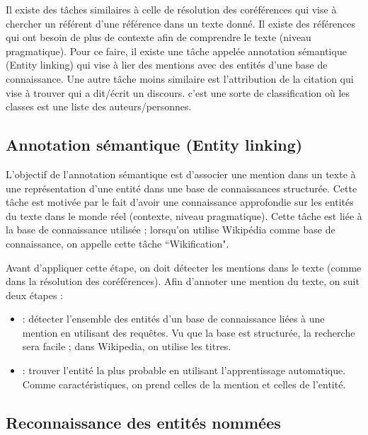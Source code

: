 \documentclass{KodeBook}
\begin{document}
Il existe des tâches similaires à celle de résolution des coréférences qui vise à chercher un référent d'une référence dans un texte donné. 
Il existe des références qui ont besoin de plus de contexte afin de comprendre le texte (niveau pragmatique). 
Pour ce faire, il existe une tâche appelée annotation sémantique (Entity linking) qui vise à lier des mentions avec des entités d'une base de connaissance. 
Une autre tâche moins similaire est l'attribution de la citation qui vise à trouver qui a dit/écrit un discours. 
c'est une sorte de classification où les classes est une liste des auteurs/personnes.


\subsection{Annotation sémantique (Entity linking)}

L'objectif de l'annotation sémantique est d'associer une mention dans un texte à une représentation d'une entité dans une base de connaissances structurée. 
Cette tâche est motivée par le fait d'avoir une connaissance approfondie sur les entités du texte dans le monde réel (contexte, niveau pragmatique).
Cette tâche est liée à la base de connaissance utilisée ; lorsqu'on utilise Wikipédia comme base de connaissance, on appelle cette tâche ``Wikification".

Avant d'appliquer cette étape, on doit détecter les mentions dans le texte (comme dans la résolution des coréférences).
Afin d'annoter une mention du texte, on suit deux étapes :
\begin{itemize}
	\item {} : détecter l'ensemble des entités d'un base de connaissance liées à une mention en utilisant des requêtes.
	Vu que la base est structurée, la recherche sera facile ; dans Wikipedia, on utilise les titres.
	\item {} : trouver l'entité la plus probable en utilisant l'apprentissage automatique. 
	Comme caractéristiques, on prend celles de la mention et celles de l'entité.
\end{itemize}

\subsection{Reconnaissance des entités nommées}
\end{document}
